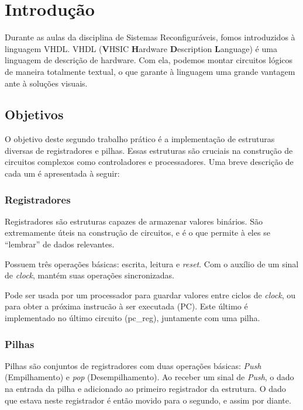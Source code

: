 \documentclass{article}
\begin{document}


\newpage
\thispagestyle{empty}
\tableofcontents

\newpage
\large %

\section{Introdução}

Durante as aulas da disciplina de Sistemas Reconfiguráveis, fomos introduzidos à linguagem VHDL. VHDL (\textbf{V}HSIC \textbf{H}ardware \textbf{D}escription \textbf{L}anguage) é uma linguagem de descrição de hardware. Com ela, podemos montar circuitos lógicos de maneira totalmente textual, o que garante à linguagem uma grande vantagem ante à soluções visuais.

\subsection{Objetivos}

O objetivo deste segundo trabalho prático é a implementação de estruturas diversas de registradores e pilhas. Essas estruturas são cruciais na construção de circuitos complexos como controladores e processadores. Uma breve descrição de cada um é apresentada à seguir:

\subsubsection{Registradores}

Registradores são estruturas capazes de armazenar valores binários. São extremamente úteis na construção de circuitos, e é o que permite à eles se ``lembrar'' de dados relevantes.

Possuem três operações básicas: escrita, leitura e \textit{reset}. Com o auxílio de um sinal de \textit{clock}, mantém suas operações sincronizadas.

Pode ser usada por um processador para guardar valores entre ciclos de \textit{clock}, ou para obter a próxima instrucão à ser executada (PC). Este último é implementado no último circuito (pc\_reg), juntamente com uma pilha.

\subsubsection{Pilhas}

Pilhas são conjuntos de registradores com duas operações básicas: \textit{Push} (Empilhamento) e \textit{pop} (Desempilhamento). Ao receber um sinal de \textit{Push}, o dado na entrada da pilha e adicionado ao primeiro registrador da estrutura. O dado que estava neste registrador é então movido para o segundo, e assim por diante.
\end{document}

